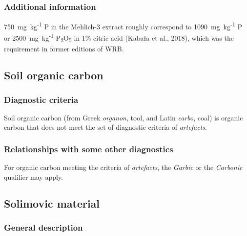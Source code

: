 \documentclass[
  letterpaper,
  DIV=11,
  numbers=noendperiod]{scrreprt}
\begin{document}
\hypertarget{additional-information-33}{%
\subsubsection{Additional information}\label{additional-information-33}}

750~mg~kg\textsuperscript{-1} P in the Mehlich-3 extract roughly
correspond to 1090~mg~kg\textsuperscript{-1} P or
2500~mg~kg\textsuperscript{-1} P\textsubscript{2}O\textsubscript{5} in
1\% citric acid (Kabała et al., 2018), which was the requirement in
former editions of WRB.

\hypertarget{soil-organic-carbon}{%
\subsection{Soil organic carbon}\label{soil-organic-carbon}}

\hypertarget{diagnostic-criteria-72}{%
\subsubsection{Diagnostic criteria}\label{diagnostic-criteria-72}}

Soil organic carbon (from Greek \emph{organon}, tool, and Latin
\emph{carbo}, coal) is organic carbon that does not meet the set of
diagnostic criteria of \emph{artefacts}.

\hypertarget{relationships-with-some-other-diagnostics-62}{%
\subsubsection{Relationships with some other
diagnostics}\label{relationships-with-some-other-diagnostics-62}}

For organic carbon meeting the criteria of \emph{artefacts}, the
\emph{Garbic} or the \emph{Carbonic} qualifier may apply.

\hypertarget{solimovic-material}{%
\subsection{Solimovic material}\label{solimovic-material}}

\hypertarget{general-description-67}{%
\subsubsection{General description}\label{general-description-67}}
\end{document}
